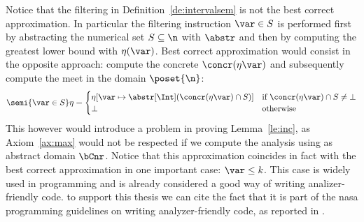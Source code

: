 Notice that the filtering in Definition~\ref{de:intervalsem} is not
the best correct approximation. In particular the filtering
instruction \(\var\in S\) is performed first by abstracting the
numerical set \(S \subseteq \n\) with \(\abstr\) and then by
computing the greatest lower bound with \(\eta(\var)\). Best correct
approximation would consist in the opposite approach: compute the
concrete \(\concr(\eta\var)\) and subsequently compute the meet in
the domain \(\poset{\n}\):
\begin{equation*}
  \semi{\var\in S}\eta = \begin{cases}
    \eta[\var \mapsto \abstr[\Int](\concr(\eta\var) \cap S)]
    & \text{if } \concr(\eta\var) \cap S \neq \bot \\
    \bot & \text{otherwise}
  \end{cases}
\end{equation*}
This however would introduce a problem in proving Lemma~\ref{le:inc},
as Axiom~\ref{ax:max} would not be respected if we compute the
analysis using as abstract domain \(\bCnr\).  Notice that this
approximation coincides in fact with the best correct approximation in
one important case: \(\var \leq k\). This case is widely used in
programming and is already considered a good way of writing
analizer-friendly code. to support this thesis we can cite the fact
that it is part of the nasa programming guidelines on writing
analyzer-friendly code, as reported in \cite{nasa:ten}.